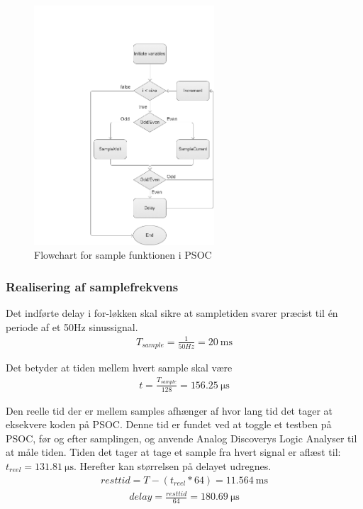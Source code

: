 \begin{figure}[htbp] %
	\centering
	\includegraphics[width=0.6\textwidth]{Figure/MEsample}
	\caption{Flowchart for sample funktionen i PSOC}
	\label{fig:MEsample}
\end{figure}

\subsubsection{Realisering af samplefrekvens}

Det indførte delay i for-løkken skal sikre at sampletiden svarer præcist til én periode af et 50Hz sinussignal.
\begin{align}
T_{sample} = \frac{1}{50Hz} = \SI{20}{\milli\second}
\end{align}

Det betyder at tiden mellem hvert sample skal være
\begin{align}
t = \frac{T_{sample}}{128} = \SI{156,25} {\micro\second}
\end{align}

Den reelle tid der er mellem samples afhænger af hvor lang tid det tager at eksekvere koden på PSOC. Denne tid er fundet ved at toggle et testben på PSOC, før og efter samplingen, og anvende Analog Discoverys Logic Analyser til at måle tiden. Tiden det tager at tage et sample fra hvert signal er aflæst til: $t_{reel} = \SI{131,81}{\micro\second}$.  Herefter kan størrelsen på delayet udregnes.
\begin{align}
resttid = T - (t_{reel}*64) = \SI{11,564}{\milli\second}
\end{align}
\begin{align}
delay = \frac{resttid}{64} = \SI{180,69} {\micro\second}
\label{eq:MEdelay}
\end{align}

